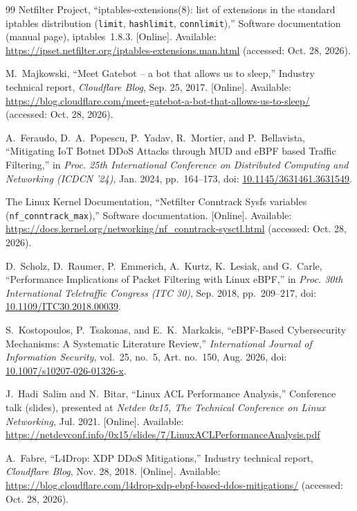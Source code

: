 \documentclass[a4paper,12pt]{article}
\begin{document}
\begin{thebibliography}{99}
Netfilter Project, ``iptables-extensions(8): list of extensions in the standard iptables distribution (\texttt{limit}, \texttt{hashlimit}, \texttt{connlimit}),'' Software documentation (manual page), iptables~1.8.3. [Online]. Available: \url{https://ipset.netfilter.org/iptables-extensions.man.html} (accessed: Oct. 28, 2026).

M.~Majkowski, ``Meet Gatebot -- a bot that allows us to sleep,'' Industry technical report, \textit{Cloudflare Blog}, Sep. 25, 2017. [Online]. Available: \url{https://blog.cloudflare.com/meet-gatebot-a-bot-that-allows-us-to-sleep/} (accessed: Oct. 28, 2026).

A.~Feraudo, D.~A.~Popescu, P.~Yadav, R.~Mortier, and P.~Bellavista, ``Mitigating IoT Botnet DDoS Attacks through MUD and eBPF based Traffic Filtering,'' in \textit{Proc. 25th International Conference on Distributed Computing and Networking (ICDCN '24)}, Jan. 2024, pp.~164--173, doi: \href{https://doi.org/10.1145/3631461.3631549}{10.1145/3631461.3631549}.

The Linux Kernel Documentation, ``Netfilter Conntrack Sysfs variables (\texttt{nf\_conntrack\_max}),'' Software documentation. [Online]. Available: \url{https://docs.kernel.org/networking/nf_conntrack-sysctl.html} (accessed: Oct. 28, 2026).

D.~Scholz, D.~Raumer, P.~Emmerich, A.~Kurtz, K.~Lesiak, and G.~Carle, ``Performance Implications of Packet Filtering with Linux eBPF,'' in \textit{Proc. 30th International Teletraffic Congress (ITC 30)}, Sep. 2018, pp.~209--217, doi: \href{https://doi.org/10.1109/ITC30.2018.00039}{10.1109/ITC30.2018.00039}.

S.~Kostopoulos, P.~Tsakonas, and E.~K.~Markakis, ``eBPF-Based Cybersecurity Mechanisms: A Systematic Literature Review,'' \textit{International Journal of Information Security}, vol.~25, no.~5, Art. no.~150, Aug. 2026, doi: \href{https://doi.org/10.1007/s10207-026-01326-x}{10.1007/s10207-026-01326-x}.

J.~Hadi~Salim and N.~Bitar, ``Linux ACL Performance Analysis,'' Conference talk (slides), presented at \textit{Netdev 0x15, The Technical Conference on Linux Networking}, Jul. 2021. [Online]. Available: \url{https://netdevconf.info/0x15/slides/7/LinuxACLPerformanceAnalysis.pdf}

A.~Fabre, ``L4Drop: XDP DDoS Mitigations,'' Industry technical report, \textit{Cloudflare Blog}, Nov. 28, 2018. [Online]. Available: \url{https://blog.cloudflare.com/l4drop-xdp-ebpf-based-ddos-mitigations/} (accessed: Oct. 28, 2026).


\end{thebibliography}
\end{document}
